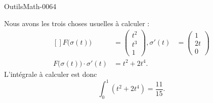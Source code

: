 
\begin{corrige}{OutilsMath-0064}

    Nous avons les trois choses usuelles à calculer :
    \begin{equation}
        \begin{aligned}[]
            F\big( \sigma(t) \big)&=\begin{pmatrix}
                t^2    \\ 
                t^3    \\ 
                1    
            \end{pmatrix},
            \sigma'(t)&=\begin{pmatrix}
                1    \\ 
                2t    \\ 
                0    
            \end{pmatrix}\\
            F\big( \sigma(t) \big)\cdot\sigma'(t)&=t^2+2t^4.
        \end{aligned}
    \end{equation}
    L'intégrale à calculer est donc
    \begin{equation}
        \int_0^1(t^2+2t^4)=\frac{ 11 }{ 15 }.
    \end{equation}

\end{corrige}
